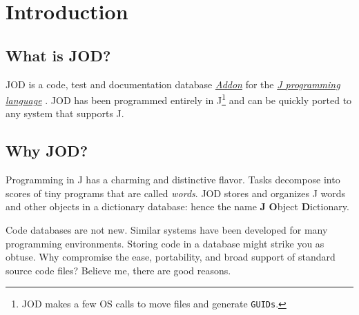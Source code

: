    \section{Introduction}
   
   \subsection{What is JOD?}
   
   JOD is a code, test and documentation database \href{http://www.jsoftware.com/jwiki/Addons}{\emph{Addon}} for the
     \href{http://www.jsoftware.com}{\emph{J programming language}} \cite{RKWHui:jdictionary}. JOD has been 
      programmed entirely in J\footnote{JOD makes a few OS calls to move files and generate \texttt{GUIDs}.}
      and can be quickly ported to any system that supports J.
   
   \subsection{Why JOD?}  
   
   Programming in J 
   has a charming and distinctive flavor.  Tasks decompose into scores of tiny
   programs that are called \emph{words}. JOD stores and organizes
   J words and other objects in a dictionary database: hence the 
   name \textbf{J} \textbf{O}bject \textbf{D}ictionary.
   
   Code  databases are not new.  Similar systems have 
   been developed for many programming
   environments. Storing code in a database might strike you as obtuse.  
   Why compromise the ease, portability, and broad support of standard source code  
   files? Believe me,
   there are good reasons.
   
